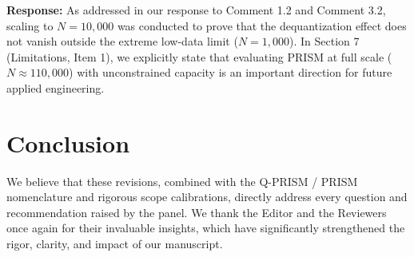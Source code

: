 \documentclass[10pt,letterpaper]{article}
\begin{document}
\noindent \textbf{Response:} As addressed in our response to Comment 1.2 and Comment 3.2, scaling to $N = 10{,}000$ was conducted to prove that the dequantization effect does not vanish outside the extreme low-data limit ($N=1{,}000$). In Section 7 (Limitations, Item 1), we explicitly state that evaluating PRISM at full scale ($N \approx 110{,}000$) with unconstrained capacity is an important direction for future applied engineering.

\vspace{1.5em}
\section*{Conclusion}

We believe that these revisions, combined with the Q-PRISM / PRISM nomenclature and rigorous scope calibrations, directly address every question and recommendation raised by the panel. We thank the Editor and the Reviewers once again for their invaluable insights, which have significantly strengthened the rigor, clarity, and impact of our manuscript.
\end{document}
